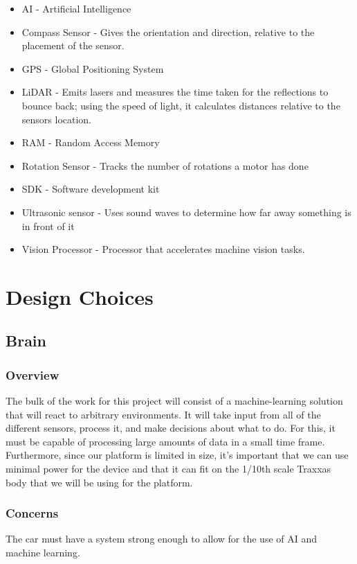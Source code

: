 \documentclass[onecolumn, draftclsnofoot, 10pt, compsoc]{IEEEtran}
\begin{document}
\begin{itemize}
\item AI - Artificial Intelligence 
\item Compass Sensor - Gives the orientation and direction, relative to the placement of the sensor.
\item GPS - Global Positioning System
\item LiDAR - Emits lasers and measures the time taken for the reflections to bounce back; using the speed of light, it calculates distances relative to the sensors location. 
\item RAM - Random Access Memory 
\item Rotation Sensor - Tracks the number of rotations a motor has done
\item SDK - Software development kit
\item Ultrasonic sensor -  Uses sound waves to determine how far away something is in front of it
\item Vision Processor - Processor that accelerates machine vision tasks.
\end{itemize}

\section{Design Choices}

\subsection{Brain}

\subsubsection{Overview}

The bulk of the work for this project will consist of a machine-learning solution that will react to arbitrary environments. It will take input from all of the different sensors, process it, and make decisions about what to do. For this, it must be capable of processing large amounts of data in a small time frame. Furthermore, since our platform is limited in size, it's important that we can use minimal power for the device and that it can fit on the 1/10th scale Traxxas body that we will be using for the platform. 

\subsubsection{Concerns}
The car must have a system strong enough to allow for the use of AI and machine learning. 
\end{document}

